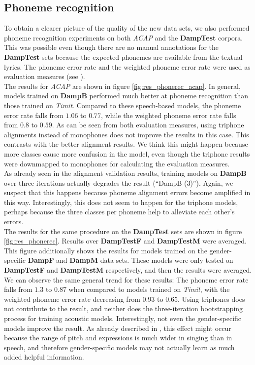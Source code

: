 \subsection{Phoneme recognition}
To obtain a clearer picture of the quality of the new data sets, we also performed phoneme recognition experiments on both \textit{ACAP} and the \textbf{DampTest} corpora. This was possible even though there are no manual annotations for the \textbf{DampTest} sets because the expected phonemes are available from the textual lyrics. The phoneme error rate and the weighted phoneme error rate were used as evaluation measures (see \cite{kruspe_phonerec}).\\
The results for \textit{ACAP} are shown in figure \ref{fig:res_phonerec_acap}. In general, models trained on \textbf{DampB} performed much better at phoneme recognition than those trained on \textit{Timit}. Compared to these speech-based models, the phoneme error rate falls from $1.06$ to $0.77$, while the weighted phoneme error rate falls from $0.8$ to $0.59$. As can be seen from both evaluation measures, using triphone alignments instead of monophones does not improve the results in this case. This contrasts with the better alignment results. We think this might happen because more classes cause more confusion in the model, even though the triphone results were downmapped to monophones for calculating the evaluation measures.\\
As already seen in the alignment validation results, training models on \textbf{DampB} over three iterations actually degrades the result (``DampB (3)''). Again, we suspect that this happens because phoneme alignment errors become amplified in this way. Interestingly, this does not seem to happen for the triphone models, perhaps because the three classes per phoneme help to alleviate each other's errors.\\
The results for the same procedure on the \textbf{DampTest} sets are shown in figure \ref{fig:res_phonerec}. Results over \textbf{DampTestF} and \textbf{DampTestM} were averaged. This figure additionally shows the results for models trained on the gender-specific \textbf{DampF} and \textbf{DampM} data sets. These models were only tested on \textbf{DampTestF} and \textbf{DampTestM} respectively, and then the results were averaged.\\
We can observe the same general trend for these results: The phoneme error rate falls from $1.3$ to $0.87$ when compared to models trained on \textit{Timit}, with the weighted phoneme error rate decreasing from $0.93$ to $0.65$. Using triphones does not contribute to the result, and neither does the three-iteration bootstrapping process for training acoustic models. Interestingly, not even the gender-specific models improve the result. As already described in \cite{kruspe_phonerec}, this effect might occur because the range of pitch and expressions is much wider in singing than in speech, and therefore gender-specific models may not actually learn as much added helpful information.



